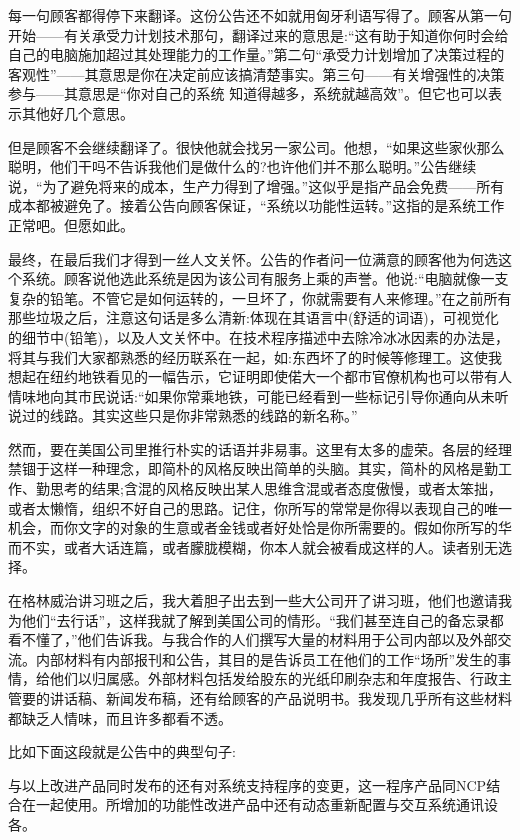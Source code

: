 每一句顾客都得停下来翻译。这份公告还不如就用匈牙利语写得了。顾客从第一句开始——有关承受力计划技术那句，翻译过来的意思是:“这有助于知道你何时会给自己的电脑施加超过其处理能力的工作量。”第二句“承受力计划增加了决策过程的客观性”——其意思是你在决定前应该搞清楚事实。第三句——有关增强性的决策参与——其意思是“你对自己的系统 知道得越多，系统就越高效”。但它也可以表示其他好几个意思。

但是顾客不会继续翻译了。很快他就会找另一家公司。他想，“如果这些家伙那么聪明，他们干吗不告诉我他们是做什么的?也许他们并不那么聪明。”公告继续说，“为了避免将来的成本，生产力得到了增强。”这似乎是指产品会免费——所有成本都被避免了。接着公告向顾客保证，“系统以功能性运转。”这指的是系统工作正常吧。但愿如此。

最终，在最后我们才得到一丝人文关怀。公告的作者问一位满意的顾客他为何选这个系统。顾客说他选此系统是因为该公司有服务上乘的声誉。他说:“电脑就像一支复杂的铅笔。不管它是如何运转的，一旦坏了，你就需要有人来修理。”在之前所有那些垃圾之后，注意这句话是多么清新:体现在其语言中(舒适的词语)，可视觉化的细节中(铅笔)，以及人文关怀中。在技术程序描述中去除冷冰冰因素的办法是，将其与我们大家都熟悉的经历联系在一起，如:东西坏了的时候等修理工。这使我想起在纽约地铁看见的一幅告示，它证明即使偌大一个都市官僚机构也可以带有人情味地向其市民说话:“如果你常乘地铁，可能已经看到一些标记引导你通向从未听说过的线路。其实这些只是你非常熟悉的线路的新名称。”

然而，要在美国公司里推行朴实的话语并非易事。这里有太多的虚荣。各层的经理禁锢于这样一种理念，即简朴的风格反映出简单的头脑。其实，简朴的风格是勤工作、勤思考的结果;含混的风格反映出某人思维含混或者态度傲慢，或者太笨拙，或者太懒惰，组织不好自己的思路。记住，你所写的常常是你得以表现自己的唯一机会，而你文字的对象的生意或者金钱或者好处恰是你所需要的。假如你所写的华而不实，或者大话连篇，或者朦胧模糊，你本人就会被看成这样的人。读者别无选择。

在格林威治讲习班之后，我大着胆子出去到一些大公司开了讲习班，他们也邀请我为他们“去行话”，这样我就了解到美国公司的情形。“我们甚至连自己的备忘录都看不懂了，”他们告诉我。与我合作的人们撰写大量的材料用于公司内部以及外部交流。内部材料有内部报刊和公告，其目的是告诉员工在他们的工作“场所”发生的事情，给他们以归属感。外部材料包括发给股东的光纸印刷杂志和年度报告、行政主管要的讲话稿、新闻发布稿，还有给顾客的产品说明书。我发现几乎所有这些材料都缺乏人情味，而且许多都看不透。

比如下面这段就是公告中的典型句子:

与以上改进产品同时发布的还有对系统支持程序的变更，这一程序产品同NCP结合在一起使用。所增加的功能性改进产品中还有动态重新配置与交互系统通讯设各。

